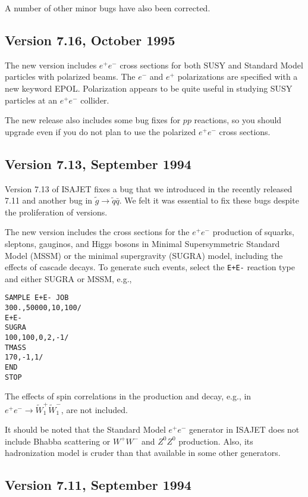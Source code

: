       A number of other minor bugs have also been corrected. 

\subsection{Version 7.16, October 1995}

       The new version includes $e^+e^-$ cross sections for both SUSY
and Standard Model particles with polarized beams. The $e^-$ and $e^+$
polarizations are specified with a new keyword EPOL. Polarization
appears to be quite useful in studying SUSY particles at an $e^+e^-$
collider.

      The new release also includes some bug fixes for $pp$ reactions,
so you should upgrade even if you do not plan to use the polarized
$e^+e^-$ cross sections.

\subsection{Version 7.13, September 1994}

      Version 7.13 of ISAJET fixes a bug that we introduced in the
recently released 7.11 and another bug in $\tilde g \to \tilde q \bar
q$. We felt it was essential to fix these bugs despite the
proliferation of versions.

      The new version includes the cross sections for the $e^+e^-$
production of squarks, sleptons, gauginos, and Higgs bosons in Minimal
Supersymmetric Standard Model (MSSM) or the minimal supergravity
(SUGRA) model, including the effects of cascade decays. To generate
such events, select the \verb|E+E-| reaction type and either SUGRA or
MSSM, e.g.,
\begin{verbatim}
SAMPLE E+E- JOB
300.,50000,10,100/
E+E-
SUGRA
100,100,0,2,-1/
TMASS
170,-1,1/
END
STOP
\end{verbatim}
The effects of spin correlations in the production and decay, e.g., in
$e^+e^- \to \widetilde W_1^+ \widetilde W_1^-$, are not included. 

      It should be noted that the Standard Model $e^+e^-$ generator in
ISAJET does not include Bhabba scattering or $W^+W^-$ and $Z^0Z^0$
production. Also, its hadronization model is cruder than that
available in some other generators.

\subsection{Version 7.11, September 1994}


